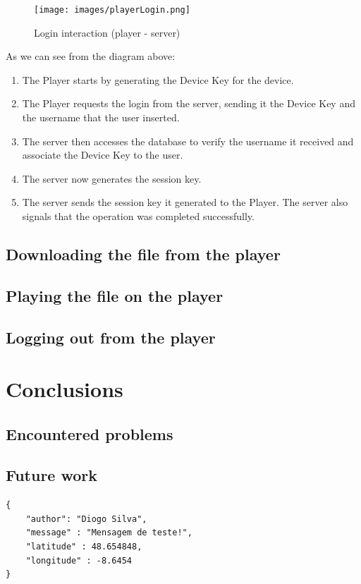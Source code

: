\documentclass[11pt,a4paper]{report}
\begin{document}
\begin{figure}[H]
\centerline{\texttt{[image: images/playerLogin.png]}}
\caption{Login interaction (player - server)}
\label{player}
\end{figure}

As we can see from the diagram above:
\begin{enumerate}
  \item The Player starts by generating the Device Key for the device.
  \item The Player requests the login from the server, sending it the Device Key and the username that the user inserted. 
  \item The server then accesses the database to verify the username it received and associate the Device Key to the user.
  \item The server now generates the session key.
  \item The server sends the session key it generated to the Player. The server also signals that the operation was completed successfully.
\end{enumerate}

\subsection{Downloading the file from the player}


\subsection{Playing the file on the player}
\subsection{Logging out from the player}

\section{Conclusions}
\subsection{Encountered problems}
\subsection{Future work}

\begin{lstlisting}[frame=single,
               framesep=3mm,
               xleftmargin=21pt,
               tabsize=4]
{     
    "author": "Diogo Silva",
    "message" : "Mensagem de teste!",
    "latitude" : 48.654848,
    "longitude" : -8.6454
}
\end{lstlisting}
\printglossaries
{}




\listoffigures
{}
\end{document}
